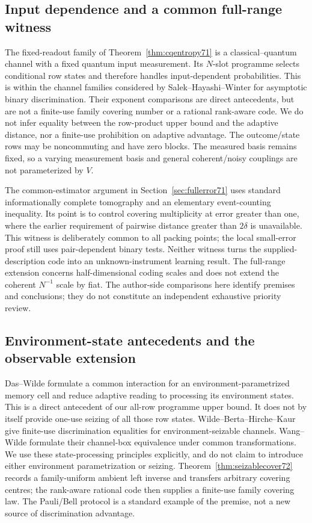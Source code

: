 \subsection{Input dependence and a common full-range witness}
The fixed-readout family of Theorem~\ref{thm:cqentropy71} is a
classical--quantum channel with a fixed quantum input measurement.
Its $N$-slot programme selects conditional row states and therefore
handles input-dependent probabilities. This is within the channel
families considered by Salek--Hayashi--Winter
\cite[Sections~II and V]{SHW68} for asymptotic binary discrimination.
Their exponent comparisons are direct antecedents, but are not a
finite-use family covering number or a rational rank-aware code.
We do not infer equality between the row-product upper bound and the
adaptive distance, nor a finite-use prohibition on adaptive advantage.
The outcome/state rows may be noncommuting and have zero blocks.
The measured basis remains fixed, so a varying measurement basis and
general coherent/noisy couplings are not parameterized by $V$.

The common-estimator argument in Section~\ref{sec:fullerror71} uses
standard informationally complete tomography \cite{PLS66} and an
elementary event-counting inequality. Its point is to control covering
multiplicity at error greater than one, where the earlier requirement
of pairwise distance greater than $2\delta$ is unavailable. This
witness is deliberately common to all packing points; the local
small-error proof still uses pair-dependent binary tests. Neither
witness turns the supplied-description code into an unknown-instrument
learning result. The full-range extension concerns half-dimensional
coding scales and does not extend the coherent $N^{-1}$ scale by fiat.
The author-side comparisons here identify premises and conclusions;
they do not constitute an independent exhaustive priority review.


\subsection{Environment-state antecedents and the observable extension}
Das--Wilde \cite[Definition~3 and Proposition~2]{DW72} formulate a
common interaction for an environment-parametrized memory cell and
reduce adaptive reading to processing its environment states. This is
a direct antecedent of our all-row programme upper bound. It does not
by itself provide one-use seizing of all those row states.
Wilde--Berta--Hirche--Kaur \cite[Definition~36 and Theorem~37]{WBHK72}
give finite-use discrimination equalities for environment-seizable
channels. Wang--Wilde \cite[Section~III.A]{WW72} formulate their
channel-box equivalence under common transformations. We use these
state-processing principles explicitly, and do not claim to introduce
either environment parametrization or seizing. Theorem~\ref{thm:seizablecover72}
records a family-uniform ambient left inverse and transfers arbitrary
covering centres; the rank-aware rational code then supplies a
finite-use family covering law. The Pauli/Bell protocol is a standard
example of the premise, not a new source of discrimination advantage.

